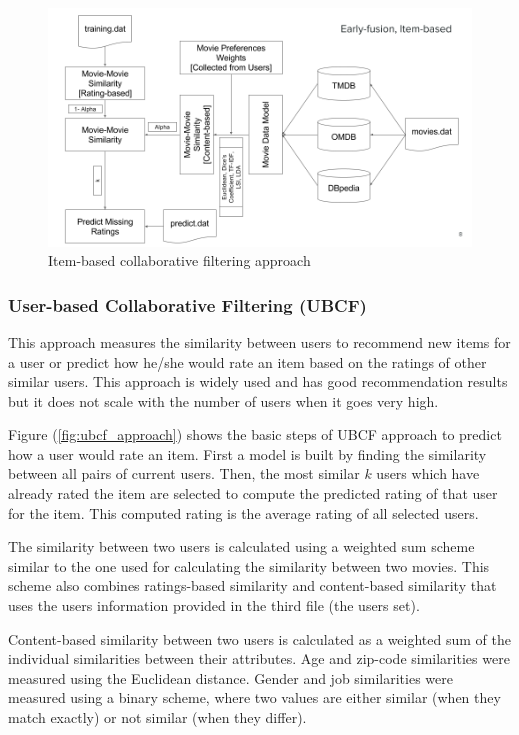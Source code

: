 \documentclass{sigish}
\begin{document}
\begin{figure}
	\centering
	\includegraphics[width=\columnwidth]{images/ibcf_approach.png}
	\caption{Item-based collaborative filtering approach}
	\label{fig:ibcf_approach}
\end{figure}

\subsubsection{User-based Collaborative Filtering (UBCF)}

This approach measures the similarity between users to recommend new items for a user or predict how he/she would rate an item based on the ratings of other similar users. This approach is widely used and has good recommendation results but it does not scale with the number of users when it goes very high.

Figure (\ref{fig:ubcf_approach}) shows the basic steps of UBCF approach to predict how a user would rate an item. First a model is built by finding the similarity between all pairs of current users. Then, the most similar $ k $ users which have already rated the item are selected to compute the predicted rating of that user for the item. This computed rating is the average rating of all selected users.

The similarity between two users is calculated using a weighted sum scheme similar to the one used for calculating the similarity between two movies. This scheme also combines ratings-based similarity and content-based similarity that uses the users information provided in the third file (the users set).

Content-based similarity between two users is calculated as a weighted sum of the individual similarities between their attributes. Age and zip-code similarities were measured using the Euclidean distance. Gender and job similarities were measured using a binary scheme, where two values are either similar (when they match exactly) or not similar (when they differ).
\end{document}
